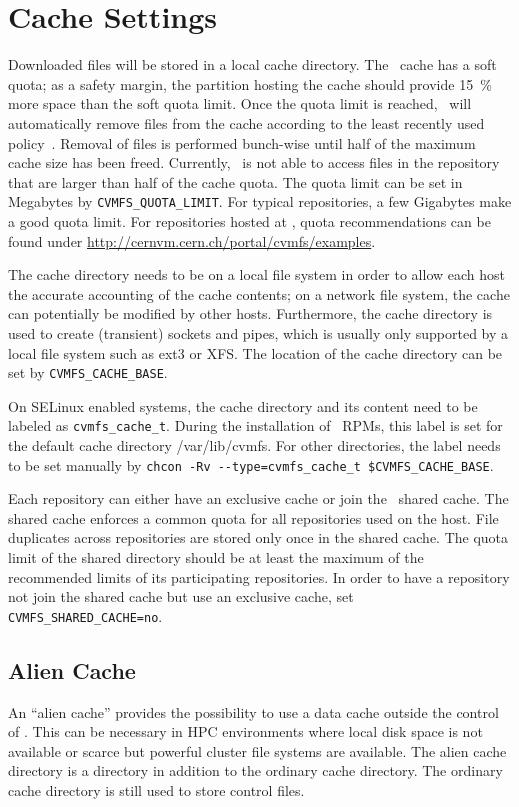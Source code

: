 \section{Cache Settings}
\label{sct:config:cache}
Downloaded files will be stored in a local cache directory.
The \cvmfs\ cache has a soft quota; as a safety margin, the partition hosting the cache should provide \SI{15}{\percent} more space than the soft quota limit.
Once the quota limit is reached, \cvmfs\ will automatically remove files from the cache according to the least recently used policy~\cite{lru06}.
Removal of files is performed bunch-wise until half of the maximum cache size has been freed.
Currently, \cvmfs\ is not able to access files in the repository that are larger than half of the cache quota.
The quota limit can be set in Megabytes by \texttt{CVMFS\_QUOTA\_LIMIT}.
For typical repositories, a few Gigabytes make a good quota limit.
For repositories hosted at \cern, quota recommendations can be found under \url{http://cernvm.cern.ch/portal/cvmfs/examples}.

The cache directory needs to be on a local file system in order to allow each host the accurate accounting of the cache contents; on a network file system, the cache can potentially be modified by other hosts.
Furthermore, the cache directory is used to create (transient) sockets and pipes, which is usually only supported by a local file system such as ext3 or XFS.
The location of the cache directory can be set by \texttt{CVMFS\_CACHE\_BASE}.

On SELinux enabled systems, the cache directory and its content need to be labeled as \texttt{cvmfs\_cache\_t}.
During the installation of \cvmfs\ RPMs, this label is set for the default cache directory /var/lib/cvmfs.
For other directories, the label needs to be set manually by \texttt{chcon~-Rv~-{}-type=cvmfs\_cache\_t~\$CVMFS\_CACHE\_BASE}.

Each repository can either have an exclusive cache or join the \cvmfs\ shared cache.
The shared cache enforces a common quota for all repositories used on the host.
File duplicates across repositories are stored only once in the shared cache.
The quota limit of the shared directory should be at least the maximum of the recommended limits of its participating repositories.
In order to have a repository not join the shared cache but use an exclusive cache, set \texttt{CVMFS\_SHARED\_CACHE=no}.

\subsection{Alien Cache}
An ``alien cache'' provides the possibility to use a data cache outside the control of \cvmfs.
This can be necessary in HPC environments where local disk space is not available or scarce but powerful cluster file systems are available.
The alien cache directory is a directory in addition to the ordinary cache directory.
The ordinary cache directory is still used to store control files.


